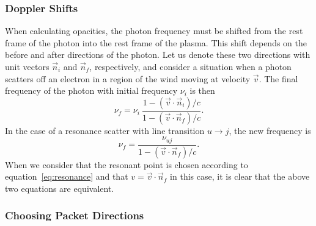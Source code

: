 \subsubsection{Doppler Shifts}

When calculating opacities, the photon frequency must be shifted from
the rest frame of the photon into the rest frame of the plasma.
This shift depends on the before and after directions of the photon. Let us denote
these two directions with unit vectors $\vec{n}_i$ and $\vec{n}_f$, respectively,
and consider a situation when a photon scatters off an electron in a region of the
wind moving at velocity $\vec{v}$.
The final frequency of the photon with initial frequency $\nu_i$ is then 
\begin{equation}
\nu_f = \nu_i ~\frac{1 - (\vec{v} \cdot \vec{n}_i) / c}{1 - (\vec{v} \cdot \vec{n}_f) / c}.
\end{equation}
In the case of a resonance scatter with line transition $u \rightarrow j$, the 
new frequency is
\begin{equation}
\nu_f = \frac{\nu_{uj}}{1 - (\vec{v} \cdot \vec{n}_f) / c}.
\end{equation}
When we consider that the resonant point is chosen according to 
equation~\ref{eq:resonance} and that $v=\vec{v} \cdot \vec{n}_f$ in this case,
it is clear that the above two equations are equivalent.


\subsubsection{Choosing Packet Directions}

